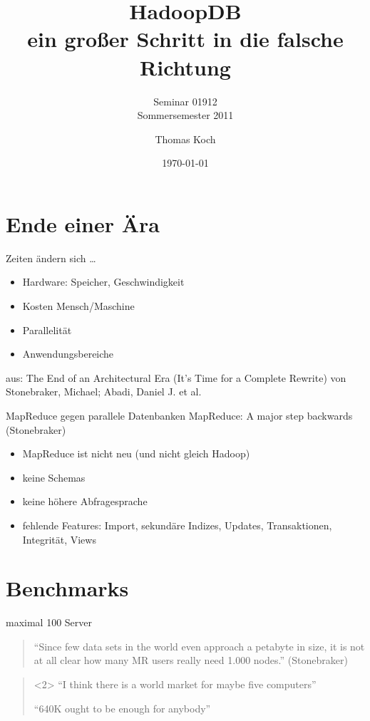 \documentclass{beamer}
\title{HadoopDB\\ ein großer Schritt in die falsche Richtung}
\subtitle[]{Seminar 01912\\ Sommersemester 2011}
\date{\today}
\author[T. Koch]{Thomas Koch}
\institute[Fernuni Hagen]{Lehrgebiet Datenbanksysteme für neue Anwendungen\\ Fernuniversität Hagen}
\begin{document}
  \begin{frame}
    \titlepage
  \end{frame}

  \begin{frame}
    \tableofcontents{}
  \end{frame}

\section{Ende einer Ära}
\begin{frame}{Zeiten ändern sich \ldots}
  \begin{itemize}
    \item Hardware: Speicher, Geschwindigkeit
    \item Kosten Mensch/Maschine
    \item Parallelität
    \item Anwendungsbereiche
  \end{itemize}
  aus: The End of an Architectural Era (It’s Time for a Complete Rewrite) von 
Stonebraker, Michael; Abadi, Daniel J. et al.
\end{frame}

\begin{frame}{MapReduce gegen parallele Datenbanken}
  MapReduce: A major step backwards (Stonebraker)
  \begin{itemize}
    \item MapReduce ist nicht neu (und nicht gleich Hadoop)
    \item keine Schemas
    \item keine höhere Abfragesprache
    \item fehlende Features: Import, sekundäre Indizes, Updates, Transaktionen, Integrität, Views
  \end{itemize}
\end{frame}

\section{Benchmarks}
\begin{frame}{}
  maximal 100 Server
  \begin{quote}
     ``Since few data sets in the world even approach a petabyte in size, it is not at all clear how many MR users really need 1.000 nodes.'' (Stonebraker)
  \end{quote}
  \begin{quote}<2>
     ``I think there is a world market for maybe five computers''
   
     ``640K ought to be enough for anybody''
  \end{quote}
\end{frame}
\end{document}
